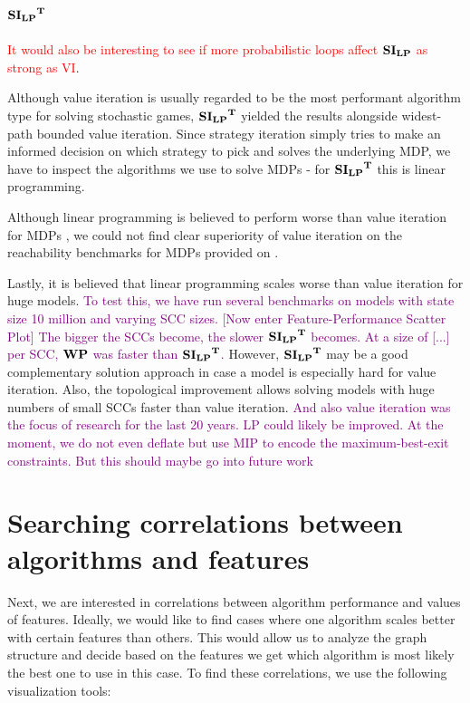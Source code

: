 \subsection{$\mathbf{\mathbf{SI_{LP}}^T}$}
\textcolor{red}{It would also be interesting to see if more probabilistic loops affect $\mathbf{SI_{LP}}$ as strong as VI}.

Although value iteration is usually regarded to be the most performant algorithm type for solving stochastic games, 
$\mathbf{\mathbf{SI_{LP}}^T}$ yielded the results alongside widest-path bounded value iteration.
Since strategy iteration simply tries to make an informed decision on which strategy to pick and solves the underlying MDP, 
we have to inspect the algorithms we use to solve MDPs - for $\mathbf{\mathbf{SI_{LP}}^T}$ this is linear programming.

Although linear programming is believed to perform worse than value iteration for MDPs \cite{ANYTHING?},
we could not find clear superiority of value iteration on the reachability benchmarks for MDPs provided on \cite{QComps}.

Lastly, it is believed that linear programming scales worse than value iteration for huge models. \textcolor{purple}{To test this, we have 
run several benchmarks on models with state size 10 million and varying SCC sizes. [Now enter Feature-Performance Scatter Plot] 
The bigger the SCCs become, the slower $\mathbf{\mathbf{SI_{LP}}^T}$ becomes. At a size of [...] per SCC, $\mathbf{WP}$ was faster than $\mathbf{\mathbf{SI_{LP}}^T}$.}
However, $\mathbf{\mathbf{SI_{LP}}^T}$ may be a good complementary solution approach in case a model is especially hard for value iteration.
Also, the topological improvement allows solving models with huge numbers of small SCCs faster than value iteration.
\textcolor{purple}{And also value iteration was the focus of research for the last 20 years. 
LP could likely be improved. At the moment, we do not even deflate but use MIP to encode the maximum-best-exit constraints. But this should maybe go into future work}


\section{Searching correlations between algorithms and features}
Next, we are interested in correlations between algorithm performance and values of features.
Ideally, we would like to find cases where one algorithm scales better with certain features than others.
This would allow us to analyze the graph structure and decide based on the features we get which algorithm is most likely the best one to use in this case.
To find these correlations, we use the following visualization tools:

